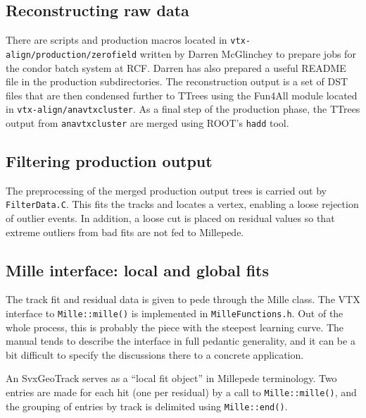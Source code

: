 \documentclass[12pt]{article}
\begin{document}
\subsection{Reconstructing raw data}
There are scripts and production macros located in \texttt{vtx-align/production/zerofield} written by Darren McGlinchey to prepare jobs for the condor batch system at RCF. Darren has also prepared a useful README file in the production subdirectories. The reconstruction output is a set of DST files that are then condensed further to TTrees using the Fun4All module located in \texttt{vtx-align/anavtxcluster}. As a final step of the production phase, the TTrees output from \texttt{anavtxcluster} are merged using ROOT's \texttt{hadd} tool.

\subsection{Filtering production output}
The preprocessing of the merged production output trees is carried out by \texttt{FilterData.C}. This fits the tracks and locates a vertex, enabling a loose rejection of outlier events. In addition, a loose cut is placed on residual values so that extreme outliers from bad fits are not fed to Millepede.

\subsection{Mille interface: local and global fits}
The track fit and residual data is given to pede through the Mille class. The VTX interface to \texttt{Mille::mille()} is implemented in \texttt{MilleFunctions.h}. Out of the whole process, this is probably the piece with the steepest learning curve. The manual tends to describe the interface in full pedantic generality, and it can be a bit difficult to specify the discussions there to a concrete application.

An SvxGeoTrack serves as a ``local fit object'' in Millepede terminology. Two entries are made for each hit (one per residual) by a call to \texttt{Mille::mille()}, and the grouping of entries by track is delimited using \texttt{Mille::end()}.
\end{document}
